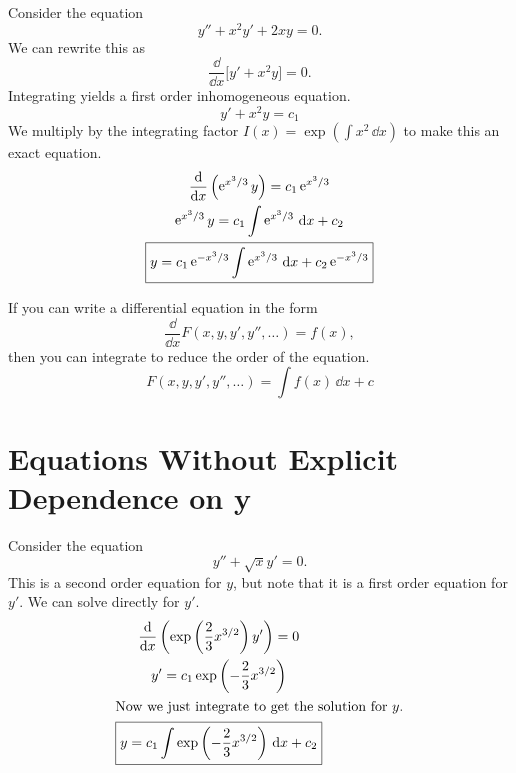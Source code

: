 \begin{Example}
  Consider the equation
  \[ 
  y'' + x^2 y' + 2x y = 0.
  \]
  We can rewrite this as
  \[ 
  \frac{\dd}{\dd x} \big[y' + x^2 y \big] = 0.
  \]
  Integrating yields a first order inhomogeneous equation.
  \[ 
  y' + x^2 y = c_1
  \]
  We multiply by the integrating factor $I(x) = \exp(\int x^2\,\dd x)$ to 
  make this an exact equation.
  \begin{gather*}
    \frac{\mathrm{d}}{\mathrm{d} x}\left( \mathop{\mathrm{e}}\nolimits^{x^3/3} y \right) = c_1 \mathop{\mathrm{e}}\nolimits^{x^3/3} \\
    \mathop{\mathrm{e}}\nolimits^{x^3/3} y = c_1 \int \mathop{\mathrm{e}}\nolimits^{x^3/3}\,\mathrm{d} x + c_2 \\
    \boxed{
      y = c_1 \mathop{\mathrm{e}}\nolimits^{-x^3/3}\int \mathop{\mathrm{e}}\nolimits^{x^3/3}\,\mathrm{d} x + c_2 \mathop{\mathrm{e}}\nolimits^{-x^3/3}
      }
  \end{gather*}
\end{Example}




\begin{Result}
  If you can write a differential equation in the form
  \[ 
  \frac{\dd}{\dd x} F(x, y, y', y'', \ldots) = f(x),
  \]
  then you can integrate to reduce the order of the equation.
  \[ 
  F(x, y, y', y'', \ldots) = \int f(x)\,\dd x + c
  \]
\end{Result}













\section{Equations Without Explicit Dependence on y}
\begin{Example}
  Consider the equation
  \[
  y'' + \sqrt{x} y' = 0.
  \]
  This is a second order equation for $y$, but note that it is a first order 
  equation for $y'$.  We can solve directly for $y'$.
  \begin{gather*}
    \frac{\mathrm{d}}{\mathrm{d} x} \left( \exp\left(\frac{2}{3}x^{3/2} \right) y' \right) = 0 \\
    y' = c_1 \exp\left(-\frac{2}{3}x^{3/2} \right) \\
    \intertext{Now we just integrate to get the solution for $y$.}
    \boxed{y = c_1 \int \exp\left(-\frac{2}{3} x^{3/2} \right)\,\mathrm{d} x + c_2}
  \end{gather*}
\end{Example}



